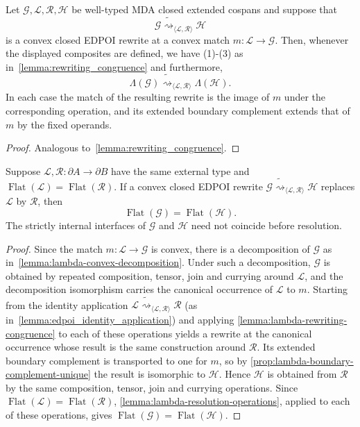 \begin{lemma}
\label{lemma:lambda-rewriting-congruence}
Let $\mathcal{G}, \mathcal{L}, \mathcal{R}, \mathcal{H}$ be well-typed
MDA closed extended cospans and suppose that
\[
\mathcal{G} \widetilde{\rightsquigarrow}_{\langle \mathcal{L}, \mathcal{R} \rangle} \mathcal{H}
\]
is a convex closed EDPOI rewrite at a convex match
$m : \mathcal{L} \to \mathcal{G}$.
Then, whenever the displayed composites are defined, we have (1)-(3) as
in~\cref{lemma:rewriting_congruence} and furthermore,
\[
\Lambda(\mathcal{G}) \widetilde{\rightsquigarrow}_{\langle \mathcal{L}, \mathcal{R} \rangle} \Lambda(\mathcal{H}).
\]
In each case the match of the resulting rewrite is the image of $m$
under the corresponding operation, and its extended boundary complement
extends that of $m$ by the fixed operands.
\end{lemma}
\begin{proof}
Analogous to~\cref{lemma:rewriting_congruence}.
\end{proof}

\begin{lemma}
\label{lemma:lambda-resolution-locality}
Suppose $\mathcal L,\mathcal R:\partial A\to\partial B$ have the same
external type and
$\operatorname{Flat}(\mathcal L)=\operatorname{Flat}(\mathcal R)$.
If a convex closed EDPOI rewrite
$\mathcal G\mathrel{\widetilde{\rightsquigarrow}_{\langle\mathcal L,\mathcal R\rangle}}\mathcal H$
replaces $\mathcal L$ by $\mathcal R$, then
\[
 \operatorname{Flat}(\mathcal G)=\operatorname{Flat}(\mathcal H).
\]
The strictly internal interfaces of $\mathcal G$ and $\mathcal H$ need
not coincide before resolution.
\end{lemma}
\begin{proof}
Since the match $m : \mathcal{L} \to \mathcal{G}$ is convex, there is a
decomposition of $\mathcal{G}$ as in~\cref{lemma:lambda-convex-decomposition}.
Under such a decomposition, $\mathcal{G}$ is obtained by repeated
composition, tensor, join and currying around $\mathcal{L}$, and the
decomposition isomorphism carries the canonical occurrence of
$\mathcal L$ to $m$. Starting from the identity application
$\mathcal L\mathrel{\widetilde{\rightsquigarrow}_{\langle\mathcal L,\mathcal R\rangle}}\mathcal R$
(as in~\cref{lemma:edpoi_identity_application}) and applying
\cref{lemma:lambda-rewriting-congruence} to each of these operations
yields a rewrite at the canonical occurrence whose result is the same
construction around $\mathcal R$. Its extended boundary complement is
transported to one for $m$, so by
\cref{prop:lambda-boundary-complement-unique} the result is isomorphic
to $\mathcal H$. Hence $\mathcal H$ is obtained from $\mathcal R$ by the
same composition, tensor, join and currying operations.
Since $\operatorname{Flat}(\mathcal L) = \operatorname{Flat}(\mathcal R)$,
\cref{lemma:lambda-resolution-operations}, applied to each of these
operations, gives $\operatorname{Flat}(\mathcal{G}) = \operatorname{Flat}(\mathcal{H})$.
\end{proof}

